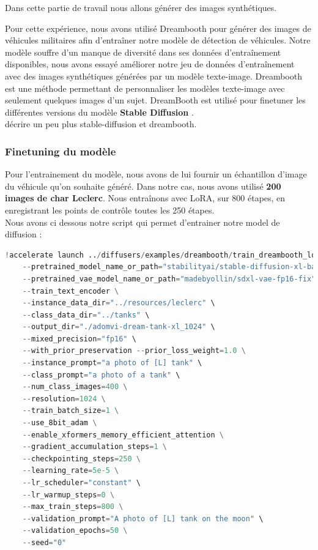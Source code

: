Dans cette partie de travail nous allons générer des images synthétiques.

Pour cette expérience, nous avons utilisé Dreambooth \cite{ruiz2023dreambooth} pour générer des images de véhicules militaires afin d'entraîner notre modèle de détection de véhicules.
Notre modèle souffre d'un manque de diversité dans ses données d'entraînement disponibles, nous avons essayé améliorer notre jeu de données d'entraînement avec des images synthétiques générées par un modèle texte-image.
Dreambooth est une méthode permettant de personnaliser les modèles texte-image avec seulement quelques images d'un sujet.
DreamBooth est utilisé pour finetuner les différentes versions du modèle \textbf{Stable Diffusion} \cite{rombach2021highresolution}.\\


décrire un peu plus stable-diffusion et dreambooth.


\subsubsection{Finetuning du modèle}

Pour l'entrainement du modèle, nous avons de lui fournir un échantillon d'image du véhicule qu'on souhaite généré.
Dans notre cas, nous avons utilisé \textbf{200 images de char Leclerc}.
Nous entraînons avec LoRA, sur 800 étapes, en enregistrant les points de contrôle toutes les 250 étapes.\\

Nous avons ci dessous notre script qui permet d'entrainer notre model de diffusion :

\lstset{style=mystyle}

\begin{lstlisting}[language=Python, basicstyle=\footnotesize\ttfamily, breaklines=false]
!accelerate launch ../diffusers/examples/dreambooth/train_dreambooth_lora_sdxl.py \
    --pretrained_model_name_or_path="stabilityai/stable-diffusion-xl-base-1.0" \
    --pretrained_vae_model_name_or_path="madebyollin/sdxl-vae-fp16-fix" \
    --train_text_encoder \
    --instance_data_dir="../resources/leclerc" \
    --class_data_dir="../tanks" \
    --output_dir="./adomvi-dream-tank-xl_1024" \
    --mixed_precision="fp16" \
    --with_prior_preservation --prior_loss_weight=1.0 \
    --instance_prompt="a photo of [L] tank" \
    --class_prompt="a photo of a tank" \
    --num_class_images=400 \
    --resolution=1024 \
    --train_batch_size=1 \
    --use_8bit_adam \
    --enable_xformers_memory_efficient_attention \
    --gradient_accumulation_steps=1 \
    --checkpointing_steps=250 \
    --learning_rate=5e-5 \
    --lr_scheduler="constant" \
    --lr_warmup_steps=0 \
    --max_train_steps=800 \
    --validation_prompt="A photo of [L] tank on the moon" \
    --validation_epochs=50 \
    --seed="0"
\end{lstlisting}

